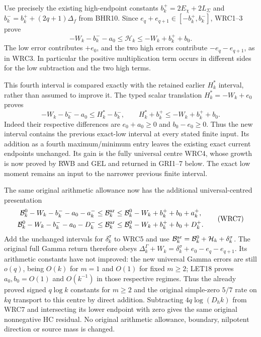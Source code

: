 \documentclass[11pt,a4paper]{article}
\begin{document}
Use precisely the existing high-endpoint constants
$b_k^+=2E_\chi+2L_\Sigma$ and
$b_k^-=b_k^++(2q+1)\Delta_f$ from BHR10.
Since $e_q+e_{q+1}\in[-b_k^+,b_k^-]$, WRC1--3 prove
\[
 -W_k-b_k^--a_0\leq\mathcal H_k
                     \leq-W_k+b_k^++b_0.
 \tag{WRC5}
\]
The low error contributes $+e_0$, and the two high errors
contribute $-e_q-e_{q+1}$, as in WRC3. In particular
the positive multiplication term occurs in different
sides for the low subtraction and the two high terms.

This fourth interval is compared exactly with the retained
earlier $H_k^*$ interval, rather than assumed to improve it.
The typed scalar translation $H_k^*=-W_k+e_0$ proves
\[
 -W_k-b_k^--a_0\leq H_k^*-b_k^-,\qquad
 H_k^*+b_k^+\leq-W_k+b_k^++b_0.
 \tag{WRC6}
\]
Indeed their respective differences are $e_0+a_0\geq0$
and $b_0-e_0\geq0$. Thus the new interval contains the
previous exact-low interval at every stated finite input.
Its addition as a fourth maximum/minimum entry leaves
the existing exact current endpoints unchanged. Its gain
is the fully universal centre WRC4, whose growth is now
proved by RWB and GEL and returned in GRI1--7 below.
The exact low moment remains an input to the narrower
previous finite interval.

The same original arithmetic allowance now has the
additional universal-centred presentation
\[
\begin{gathered}
 \mathcal B_k^0-W_k-b_k^--a_0-a_k^-
 \leq\mathcal B_k^{\rm ar}
 \leq\mathcal B_k^0-W_k+b_k^++b_0+a_k^+,\\
 \mathcal B_k^0-W_k-b_k^--a_0-D_k^-
 \leq\mathcal B_k^{\rm ar}
 \leq\mathcal B_k^0-W_k+b_k^++b_0+D_k^+.
\end{gathered}\tag{WRC7}
\]
Add the unchanged intervals for $\delta_k^\sigma$ to
WRC5 and use $\mathcal B_k^{\rm ar}=\mathcal B_k^0+
\mathcal H_k+\delta_k^\sigma$. The original full Gamma
return therefore obeys
$\Delta_k^\Gamma+W_k=\delta_k^\sigma+e_0-e_q-e_{q+1}$.
Its arithmetic constants have not improved: the new
universal Gamma errors are still $o(q)$, being $O(k)$
for $m=1$ and $O(1)$ for fixed $m\geq2$; LET18 proves
$a_0,b_0=O(1)$ and $O(k^{-1})$ in those respective regimes.
Thus the already proved signed $q\log k$ constants for
$m\geq2$ and the original simple-zero $5/7$ rate on
$kq$ transport to this centre by direct addition.
Subtracting $4q\log(D_hk)$ from WRC7 and intersecting
its lower endpoint with zero gives the same original
nonnegative HC residual. No original arithmetic allowance,
boundary, nilpotent direction or source mass is changed.
\end{document}
